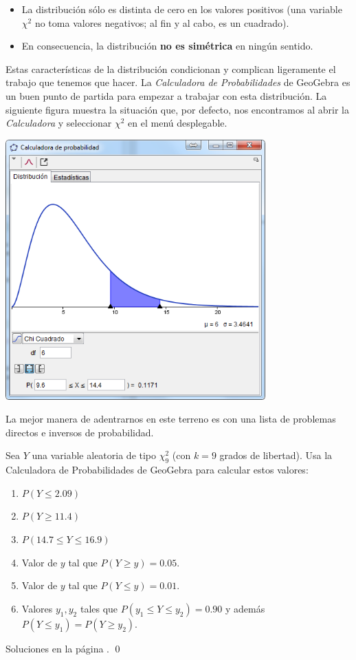 \documentclass[10pt,a4paper]{article}\usepackage[]{graphicx}\usepackage[]{color}
\newcounter {cont01}
\begin{document}
\begin{itemize}
  \item La distribución sólo es distinta de cero en los valores positivos (una variable $\chi^2$ no toma valores negativos; al fin y al cabo, es un cuadrado).
  \item En consecuencia, la distribución {\bf no es simétrica} en ningún sentido.
\end{itemize}
Estas características de la distribución condicionan y complican ligeramente el trabajo que tenemos que hacer. La {\em Calculadora de Probabilidades} de GeoGebra es un buen punto de partida para empezar a trabajar con esta distribución. La siguiente figura muestra la situación que, por defecto, nos encontramos al abrir la {\em Calculadora} y seleccionar $\chi^2$ en el menú desplegable.

    \begin{center}
    \includegraphics[width=10cm]{../fig/Tut06-29.png}
    \end{center}

La mejor manera de adentrarnos en este terreno es con una lista de problemas directos e inversos de probabilidad.

\begin{ejercicio}
\label{tut06:ejercicio17}
Sea $Y$ una variable aleatoria de tipo $\chi^2_9$ (con $k=9$ grados de libertad). Usa la Calculadora de Probabilidades de GeoGebra para calcular estos valores:
    \begin{enumerate}
        \item $P(Y\leq 2.09)$
        \item $P(Y\geq 11.4)$
        \item $P(14.7\leq Y\leq 16.9)$
        \item Valor de $y$ tal que $P(Y\geq y)=0.05$.
        \item Valor de $y$ tal que $P(Y\leq y)=0.01$.
        \item Valores $y_1, y_2$ tales que $P(y_1\leq Y\leq y_2)=0.90$ y además $P(Y\leq y_1)=P(Y\geq y_2)$.
    \end{enumerate}
Soluciones en la página \pageref{tut06:ejercicio17:sol}.
\qed
\end{ejercicio}
\end{document}
